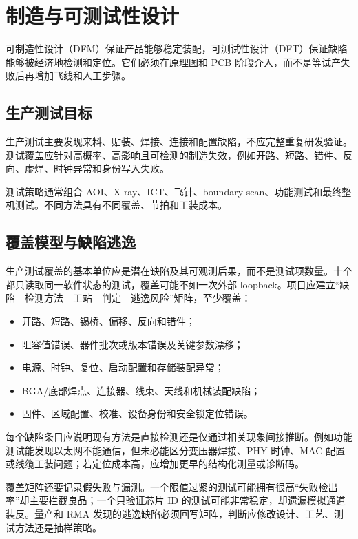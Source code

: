 \chapter{制造与可测试性设计}
\label{chap:manufacturing-dft}

可制造性设计（DFM）保证产品能够稳定装配，可测试性设计（DFT）保证缺陷能够被经济地检测和定位。它们必须在原理图和 PCB 阶段介入，而不是等试产失败后再增加飞线和人工步骤。

\section{生产测试目标}

生产测试主要发现来料、贴装、焊接、连接和配置缺陷，不应完整重复研发验证。测试覆盖应针对高概率、高影响且可检测的制造失效，例如开路、短路、错件、反向、虚焊、时钟异常和身份写入失败。

测试策略通常组合 AOI、X-ray、ICT、飞针、boundary scan、功能测试和最终整机测试。不同方法具有不同覆盖、节拍和工装成本。

\section{覆盖模型与缺陷逃逸}

生产测试覆盖的基本单位应是潜在缺陷及其可观测后果，而不是测试项数量。十个都只读取同一软件状态的测试，覆盖可能不如一次外部 loopback。项目应建立“缺陷---检测方法---工站---判定---逃逸风险”矩阵，至少覆盖：
\begin{itemize}
  \item 开路、短路、锡桥、偏移、反向和错件；
  \item 阻容值错误、器件批次或版本错误及关键参数漂移；
  \item 电源、时钟、复位、启动配置和存储装配异常；
  \item BGA/底部焊点、连接器、线束、天线和机械装配缺陷；
  \item 固件、区域配置、校准、设备身份和安全锁定位错误。
\end{itemize}

每个缺陷条目应说明现有方法是直接检测还是仅通过相关现象间接推断。例如功能测试能发现以太网不能通信，但未必能区分变压器焊接、PHY 时钟、MAC 配置或线缆工装问题；若定位成本高，应增加更早的结构化测量或诊断码。

覆盖矩阵还要记录假失败与漏测。一个限值过紧的测试可能拥有很高“失败检出率”却主要拦截良品；一个只验证芯片 ID 的测试可能非常稳定，却遗漏模拟通道装反。量产和 RMA 发现的逃逸缺陷必须回写矩阵，判断应修改设计、工艺、测试方法还是抽样策略。

